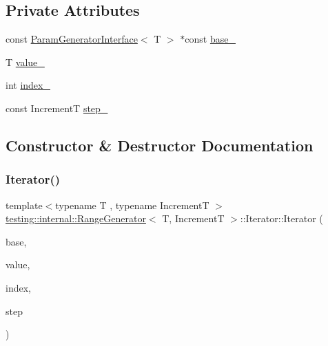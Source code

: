 \subsection*{Private Attributes}
\begin{DoxyCompactItemize}
\item 
const \mbox{\hyperlink{classtesting_1_1internal_1_1_param_generator_interface}{Param\+Generator\+Interface}}$<$ T $>$ $\ast$const \mbox{\hyperlink{classtesting_1_1internal_1_1_range_generator_1_1_iterator_a6bd4a500a5bc8ff912ac018ed526daf9}{base\+\_\+}}
\item 
T \mbox{\hyperlink{classtesting_1_1internal_1_1_range_generator_1_1_iterator_aab59a7070669d64348494a1fb1795934}{value\+\_\+}}
\item 
int \mbox{\hyperlink{classtesting_1_1internal_1_1_range_generator_1_1_iterator_a2e9064f8da43367550e82eea8adabc2c}{index\+\_\+}}
\item 
const IncrementT \mbox{\hyperlink{classtesting_1_1internal_1_1_range_generator_1_1_iterator_a18ebb51d061695f102c2ef74cade8618}{step\+\_\+}}
\end{DoxyCompactItemize}


\subsection{Constructor \& Destructor Documentation}
\mbox{\label{classtesting_1_1internal_1_1_range_generator_1_1_iterator_a960184d2ea0ff223d9cf4d6ab015baa8}} 
\subsubsection{\texorpdfstring{Iterator()}{Iterator()}\hspace{0.1cm}{\footnotesize\ttfamily [1/6]}}
{\footnotesize\ttfamily template$<$typename T , typename IncrementT $>$ \\
\mbox{\hyperlink{classtesting_1_1internal_1_1_range_generator}{testing\+::internal\+::\+Range\+Generator}}$<$ T, IncrementT $>$\+::Iterator\+::\+Iterator (\begin{DoxyParamCaption}\item[{const \mbox{\hyperlink{classtesting_1_1internal_1_1_param_generator_interface}{Param\+Generator\+Interface}}$<$ T $>$ $\ast$}]{base,  }\item[{T}]{value,  }\item[{int}]{index,  }\item[{IncrementT}]{step }\end{DoxyParamCaption})\hspace{0.3cm}{\ttfamily [inline]}}

